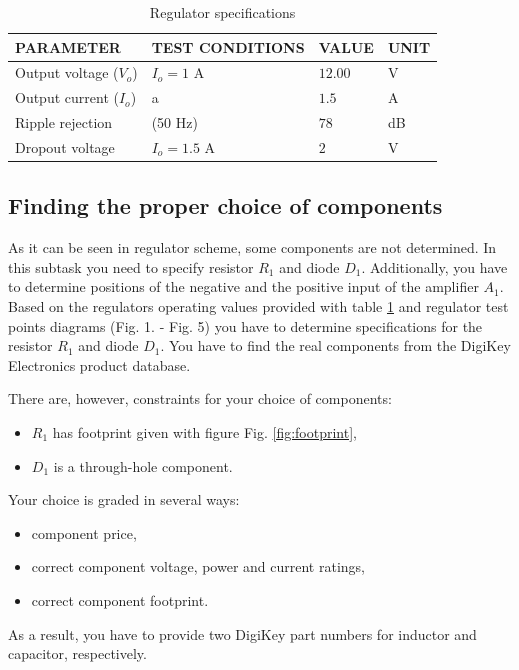 \documentclass[a4paper]{article}
\begin{document}
\begin{table}[h!]
    \caption{Regulator specifications}
    \label{tab:spec}
    \begin{tabularx}{\linewidth}{|X|X|X|X|} \hline
    PARAMETER & TEST CONDITIONS & VALUE & UNIT \\ \hline 
    Output voltage ($V_o$)& $I_o = 1$ A & $12.00$ & V \\ \hline
    Output current ($I_o$) & a & $1.5$ & A \\ \hline
    Ripple rejection & (50 Hz) & $78$ & dB \\ \hline
   	Dropout voltage & $I_o = 1.5$ A & $2$ & V \\ \hline
    \end{tabularx}
\end{table}

\subsection{Finding the proper choice of components}
\label{ele:task:1}
As it can be seen in regulator scheme, some components are not determined. In 
this subtask you need to specify resistor $R_1$ and diode $D_1$. Additionally, 
you have to determine positions of the negative and the positive input of the 
amplifier $A_1$. Based on the regulators operating values provided with table
\ref{tab:spec} and regulator test points diagrams (Fig. 1. - Fig. 5) you have 
to determine specifications for the resistor $R_1$ and diode $D_1$. You have to 
find the real components from the DigiKey Electronics product database. 

There are, however, constraints for your choice of components:
\begin{itemize}
\item $R_1$ has footprint given with figure Fig. \ref{fig:footprint},
\item $D_1$ is a through-hole component.
\end{itemize} 
 
Your choice is graded in several ways:
\begin{itemize}
\item component price,
\item correct component voltage, power and current ratings,
\item correct component footprint.
\end{itemize}
As a result, you have to provide two DigiKey part numbers for inductor and 
capacitor, respectively. 
\end{document}
